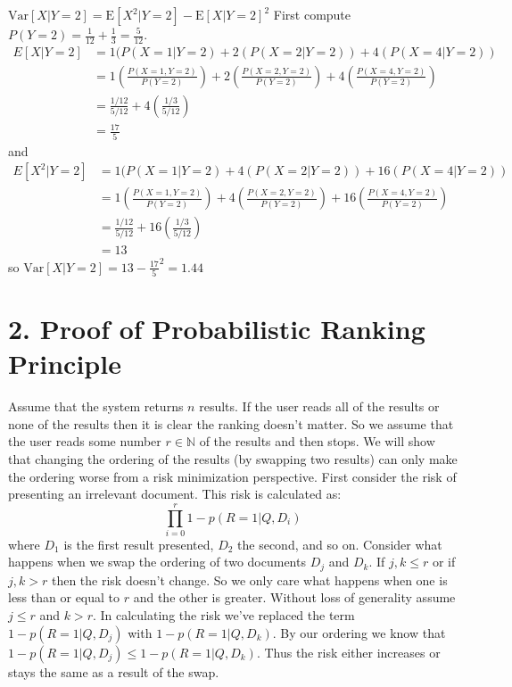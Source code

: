 \documentclass[paper=a4, fontsize=11pt]{jhwhw} %
\begin{document}
\begin{enumerate}
        $\mathrm{Var}[X|Y = 2] = \mathrm{E}[X^2|Y = 2] - \mathrm{E}[X|Y = 2]^2$
        First compute $P(Y = 2) = \frac{1}{12} + \frac{1}{3} = \frac{5}{12}$.
        \begin{align*}
            E[X|Y = 2] &= 1(P(X = 1|Y = 2) + 2(P(X = 2| Y = 2)) + 4(P(X = 4|Y = 2))\\
                       &= 1(\frac{P(X = 1, Y = 2)}{P(Y = 2)}) + 2(\frac{P(X = 2, Y = 2)}{P(Y = 2)}) + 4(\frac{P(X = 4, Y = 2)}{P(Y = 2)})\\
                       &= \frac{1/12}{5/12} + 4(\frac{1/3}{5/12})\\
                       &= \frac{17}{5}
        \end{align*}
        and
        \begin{align*}
            E[X^2|Y = 2] &= 1(P(X = 1|Y = 2) + 4(P(X = 2| Y = 2)) + 16(P(X = 4|Y = 2))\\
                       &= 1(\frac{P(X = 1, Y = 2)}{P(Y = 2)}) + 4(\frac{P(X = 2, Y = 2)}{P(Y = 2)}) + 16(\frac{P(X = 4, Y = 2)}{P(Y = 2)})\\
                       &= \frac{1/12}{5/12} + 16(\frac{1/3}{5/12})\\
                       &= 13
        \end{align*}
        so $\mathrm{Var}[X|Y = 2] = 13 - \frac{17}{5}^2 = 1.44$
\end{enumerate}
\section*{2. Proof of Probabilistic Ranking Principle}
\solution
Assume that the system returns $n$ results. If the user reads all of the results or none of the results then it is clear the ranking doesn't matter. So we assume that the user reads some number $r\in \mathbb N$ of the results and then stops. We will show that changing the ordering of the results (by swapping two results) can only make the ordering worse from a risk minimization perspective. First consider the risk of presenting an irrelevant document. This risk is calculated as:
$$\prod_{i=0}^{r} 1 - p(R = 1|Q, D_i)$$
where $D_1$ is the first result presented, $D_2$ the second, and so on. Consider what happens when we swap the ordering of two documents $D_j$ and $D_k$. If $j, k \le r$ or if $j, k > r$ then the risk doesn't change. So we only care what happens when one is less than or equal to $r$ and the other is greater. Without loss of generality assume $j \le r$ and $k > r$. In calculating the risk we've replaced the term $1 - p(R = 1|Q, D_j)$ with $1 - p(R = 1| Q, D_k)$. By our ordering we know that $1 - p(R = 1|Q, D_j) \le 1 - p(R = 1|Q, D_k)$. Thus the risk either increases or stays the same as a result of the swap.
\end{document}
